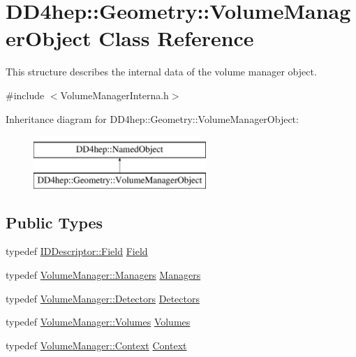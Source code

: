 \hypertarget{class_d_d4hep_1_1_geometry_1_1_volume_manager_object}{}\section{D\+D4hep\+:\+:Geometry\+:\+:Volume\+Manager\+Object Class Reference}
\label{class_d_d4hep_1_1_geometry_1_1_volume_manager_object}


This structure describes the internal data of the volume manager object.  




{\ttfamily \#include $<$Volume\+Manager\+Interna.\+h$>$}

Inheritance diagram for D\+D4hep\+:\+:Geometry\+:\+:Volume\+Manager\+Object\+:\begin{figure}[H]
\begin{center}
\leavevmode
\includegraphics[height=2.000000cm]{class_d_d4hep_1_1_geometry_1_1_volume_manager_object}
\end{center}
\end{figure}
\subsection*{Public Types}
\begin{DoxyCompactItemize}
\item 
typedef \hyperlink{class_d_d4hep_1_1_geometry_1_1_i_d_descriptor_ac06f5915e74f8a8f2ff73e9a322556e4}{I\+D\+Descriptor\+::\+Field} \hyperlink{class_d_d4hep_1_1_geometry_1_1_volume_manager_object_ab214e2fe7df311a4a2e87ec17958790c}{Field}
\item 
typedef \hyperlink{class_d_d4hep_1_1_geometry_1_1_volume_manager_ad60f5618f569c6604861b6e0eb1c71c9}{Volume\+Manager\+::\+Managers} \hyperlink{class_d_d4hep_1_1_geometry_1_1_volume_manager_object_ad98004850761b06cd3a81c68cdcc0087}{Managers}
\item 
typedef \hyperlink{class_d_d4hep_1_1_geometry_1_1_volume_manager_a89d31fb00522aa56dfa2708fedaf1e4f}{Volume\+Manager\+::\+Detectors} \hyperlink{class_d_d4hep_1_1_geometry_1_1_volume_manager_object_a3148ed79d5f6e5175060519838dbad38}{Detectors}
\item 
typedef \hyperlink{class_d_d4hep_1_1_geometry_1_1_volume_manager_a81625fd63b37636f0b4019b102aba787}{Volume\+Manager\+::\+Volumes} \hyperlink{class_d_d4hep_1_1_geometry_1_1_volume_manager_object_a6bbeb958237bc33c7228abada088f6a1}{Volumes}
\item 
typedef \hyperlink{class_d_d4hep_1_1_geometry_1_1_volume_manager_adadb14f2ccbeaad001b7bc6ddb6dc715}{Volume\+Manager\+::\+Context} \hyperlink{class_d_d4hep_1_1_geometry_1_1_volume_manager_object_ac975f498c99a0933b0b5911d4fb721b3}{Context}
\end{DoxyCompactItemize}

